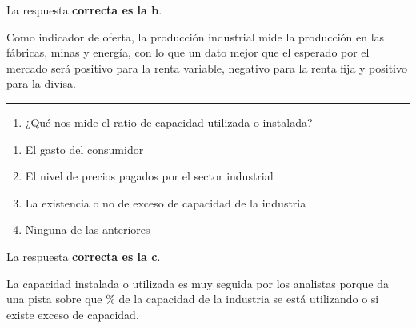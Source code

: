 \documentclass[
  letterpaper,
  DIV=11,
  numbers=noendperiod]{scrreprt}
\providecommand{\tightlist}{%
  \setlength{\itemsep}{0pt}\setlength{\parskip}{0pt}}\usepackage{longtable,booktabs,array}
\begin{document}
\begin{tcolorbox}[enhanced jigsaw, left=2mm, opacityback=0, colback=white, breakable, arc=.35mm, bottomrule=.15mm, rightrule=.15mm, toprule=.15mm, leftrule=.75mm, colframe=quarto-callout-tip-color-frame]
\begin{minipage}[t]{5.5mm}
\textcolor{quarto-callout-tip-color}{\faLightbulb}
\end{minipage}%
\begin{minipage}[t]{\textwidth - 5.5mm}

La respuesta \textbf{correcta es la b}.

Como indicador de oferta, la producción industrial mide la producción en
las fábricas, minas y energía, con lo que un dato mejor que el esperado
por el mercado será positivo para la renta variable, negativo para la
renta fija y positivo para la divisa.

\end{minipage}%
\end{tcolorbox}

\begin{center}\rule{0.5\linewidth}{0.5pt}\end{center}

\begin{enumerate}
\def\labelenumi{\arabic{enumi}.}
\setcounter{enumi}{40}
\tightlist
\item
  ¿Qué nos mide el ratio de capacidad utilizada o instalada?
\end{enumerate}

\begin{enumerate}
\def\labelenumi{\alph{enumi})}
\item
  El gasto del consumidor
\item
  El nivel de precios pagados por el sector industrial
\item
  La existencia o no de exceso de capacidad de la industria
\item
  Ninguna de las anteriores
\end{enumerate}

\begin{tcolorbox}[enhanced jigsaw, left=2mm, opacityback=0, colback=white, breakable, arc=.35mm, bottomrule=.15mm, rightrule=.15mm, toprule=.15mm, leftrule=.75mm, colframe=quarto-callout-tip-color-frame]
\begin{minipage}[t]{5.5mm}
\textcolor{quarto-callout-tip-color}{\faLightbulb}
\end{minipage}%
\begin{minipage}[t]{\textwidth - 5.5mm}

La respuesta \textbf{correcta es la c}.

La capacidad instalada o utilizada es muy seguida por los analistas
porque da una pista sobre que \% de la capacidad de la industria se está
utilizando o si existe exceso de capacidad.

\end{minipage}%
\end{tcolorbox}
\end{document}
